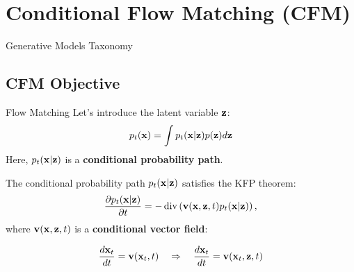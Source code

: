 \documentclass{beamer}
\renewcommand{\eqpause}{}
\begin{document}
\section{Conditional Flow Matching (CFM)}
\begin{frame}{Generative Models Taxonomy}
\end{frame}
\subsection{CFM Objective}
\begin{frame}{Flow Matching}
	Let's introduce the latent variable $\mathbf{z}$:
	\[
		p_t(\mathbf{x}) = \int p_t(\mathbf{x} | \mathbf{z}) p(\mathbf{z}) d \mathbf{z} 
	\]
	Here, $p_t(\mathbf{x} | \mathbf{z})$ is a \textbf{conditional probability path}.
	\eqpause
	The conditional probability path $p_t(\mathbf{x} | \mathbf{z})$ satisfies the KFP theorem:
	\[
		\frac{\partial p_t(\mathbf{x} | \mathbf{z})}{\partial t} = - \operatorname{div}\left(\mathbf{v}(\mathbf{x}, \mathbf{z}, t) p_t(\mathbf{x} | \mathbf{z})\right),
	\]
	where $\mathbf{v}(\mathbf{x}, \mathbf{z}, t)$ is a \textbf{conditional vector field}:
	\eqpause
	\[
		\frac{d\mathbf{x}_t}{dt} = \mathbf{v}(\mathbf{x}_t, t) \quad \Rightarrow \quad \frac{d\mathbf{x}_t}{dt} = \mathbf{v}(\mathbf{x}_t, \mathbf{z}, t)
	\]
	\vspace{-0.3cm}
\end{frame}
\end{document}
